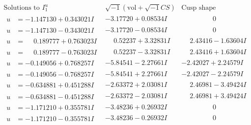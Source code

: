 \documentclass[1p]{elsarticle_modified}
\theoremstyle{definition}
\newcommand{\I}{\sqrt{-1}}
\begin{document}
$$\begin{array}{c|c|c}
\text{Solutions to }I^u_{1}& \I (\text{vol} + \sqrt{-1}CS) & \text{Cusp shape}\\
 \hline 
\begin{aligned}
u &= -1.147130 + 0.343021 I\end{aligned}
 & -3.17720 + 0.08534 I & \phantom{-0.000000 } 0 \\ \hline\begin{aligned}
u &= -1.147130 - 0.343021 I\end{aligned}
 & -3.17720 - 0.08534 I & \phantom{-0.000000 } 0 \\ \hline\begin{aligned}
u &= \phantom{-}0.189777 + 0.763023 I\end{aligned}
 & \phantom{-}0.52237 + 3.32831 I & \phantom{-}2.43416 - 1.63604 I \\ \hline\begin{aligned}
u &= \phantom{-}0.189777 - 0.763023 I\end{aligned}
 & \phantom{-}0.52237 - 3.32831 I & \phantom{-}2.43416 + 1.63604 I \\ \hline\begin{aligned}
u &= -0.149056 + 0.768257 I\end{aligned}
 & -5.84541 - 2.27661 I & -2.42027 + 2.24579 I \\ \hline\begin{aligned}
u &= -0.149056 - 0.768257 I\end{aligned}
 & -5.84541 + 2.27661 I & -2.42027 - 2.24579 I \\ \hline\begin{aligned}
u &= -0.634881 + 0.451288 I\end{aligned}
 & -2.63372 + 2.03081 I & \phantom{-}2.46981 - 3.49424 I \\ \hline\begin{aligned}
u &= -0.634881 - 0.451288 I\end{aligned}
 & -2.63372 - 2.03081 I & \phantom{-}2.46981 + 3.49424 I \\ \hline\begin{aligned}
u &= -1.171210 + 0.355781 I\end{aligned}
 & -3.48236 + 0.26932 I & \phantom{-0.000000 } 0 \\ \hline\begin{aligned}
u &= -1.171210 - 0.355781 I\end{aligned}
 & -3.48236 - 0.26932 I & \phantom{-0.000000 } 0 \\ \hline\begin{aligned}

\end{aligned}
\end{array}$$
\end{document}
